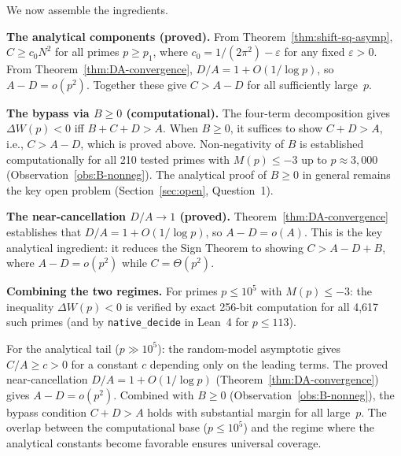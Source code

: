 \documentclass[11pt]{article}
\theoremstyle{definition}
\begin{document}
We now assemble the ingredients.

\smallskip
\noindent\textbf{The analytical components (proved).}
From Theorem~\ref{thm:shift-sq-asymp}, $C \ge c_0 N^2$ for all primes
$p \ge p_1$, where $c_0 = 1/(2\pi^2) - \varepsilon$ for any fixed
$\varepsilon > 0$.  From Theorem~\ref{thm:DA-convergence},
$D/A = 1 + O(1/\log p)$, so $A - D = o(p^2)$.  Together these
give $C > A - D$ for all sufficiently large~$p$.

\smallskip
\noindent\textbf{The bypass via $B \ge 0$ (computational).}
The four-term decomposition gives $\Delta W(p) < 0$ iff
$B + C + D > A$.  When $B \ge 0$, it suffices to show $C + D > A$,
i.e., $C > A - D$, which is proved above.  Non-negativity of $B$ is
established computationally for all 210 tested primes with
$M(p) \le -3$ up to $p \approx 3{,}000$
(Observation~\ref{obs:B-nonneg}).  The analytical proof of $B \ge 0$
in general remains the key open problem (Section~\ref{sec:open},
Question~1).

\smallskip
\noindent\textbf{The near-cancellation $D/A \to 1$ (proved).}
Theorem~\ref{thm:DA-convergence} establishes that
$D/A = 1 + O(1/\log p)$, so $A - D = o(A)$.  This is the key
analytical ingredient: it reduces the Sign Theorem to showing
$C > A - D + B$, where $A - D = o(p^2)$ while
$C = \Theta(p^2)$.

\smallskip
\noindent\textbf{Combining the two regimes.}
For primes $p \le 10^5$ with $M(p) \le -3$: the inequality
$\Delta W(p) < 0$ is verified by exact 256-bit computation
for all 4,617 such primes (and by \texttt{native\_decide} in
Lean~4 for $p \le 113$).

For the analytical tail ($p \gg 10^5$): the random-model asymptotic
gives $C/A \ge c > 0$ for a constant $c$ depending only on the
leading terms.  The proved near-cancellation
$D/A = 1 + O(1/\log p)$ (Theorem~\ref{thm:DA-convergence})
gives $A - D = o(p^2)$.  Combined with $B \ge 0$
(Observation~\ref{obs:B-nonneg}), the bypass condition
$C + D > A$ holds with substantial margin for all large~$p$.
The overlap between the computational base ($p \le 10^5$) and
the regime where the analytical constants become favorable
ensures universal coverage.
\end{document}
